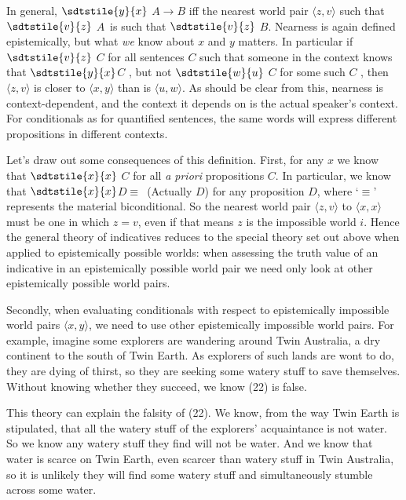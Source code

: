 In general, \(\sdtstile{y}{x}\) \(A \rightarrow B\) iff the nearest world pair \(\langle z, v \rangle\) such that \(\sdtstile{v}{z}\) \(A\)~is such that \(\sdtstile{v}{z}\) \(B\). Nearness is again defined epistemically, but what \textit{we }know about \(x\) and \(y\) matters. In particular if \(\sdtstile{v}{z}\) \(C\)  for all sentences \(C\) such that someone in the context knows that \(\sdtstile{y}{x}\)\(C\) , but not \(\sdtstile{w}{u}\) \(C\) for some such \(C\) , then \(\langle z, v \rangle\) is closer to \(\langle x, y \rangle\) than is \(\langle u, w \rangle\). As should be clear from this, nearness is context-dependent, and the context it depends on is the actual speaker's context. For conditionals as for quantified sentences, the same words will express different propositions in different contexts.

Let's draw out some consequences of this definition. First, for any \(x\) we know that \(\sdtstile{x}{x}\) \(C\) for all \textit{a priori} propositions \(C\). In particular, we know that \(\sdtstile{x}{x}\)\(D \equiv\)~(Actually \(D\)) for any proposition \(D\), where `\(\equiv\)' represents the material biconditional. So the nearest world pair \(\langle z, v \rangle\) to \(\langle x, x \rangle\) must be one in which \(z = v\), even if that means \(z\) is the impossible world \(i\). Hence the general theory of indicatives reduces to the special theory set out above when applied to epistemically possible worlds: when assessing the truth value of an indicative in an epistemically possible world pair we need only look at other epistemically possible world pairs.

Secondly, when evaluating conditionals with respect to epistemically impossible world pairs \(\langle x, y \rangle\), we need to use other epistemically impossible world pairs. For example, imagine some explorers are wandering around Twin Australia, a dry continent to the south of Twin Earth. As explorers of such lands are wont to do, they are dying of thirst, so they are seeking some watery stuff to save themselves. Without knowing whether they succeed, we know (22) is false.


\noindent This theory can explain the falsity of (22). We know, from the way Twin Earth is stipulated, that all the watery stuff of the explorers' acquaintance is not water. So we know any watery stuff they find will not be water. And we know that water is scarce on Twin Earth, even scarcer than watery stuff in Twin Australia, so it is unlikely they will find some watery stuff and simultaneously stumble across some water.

